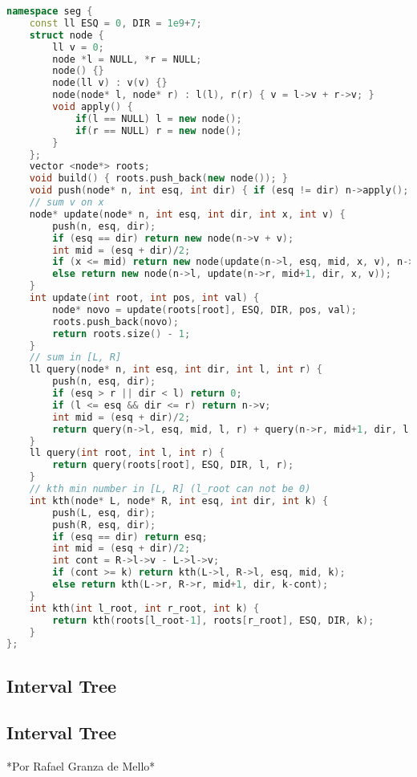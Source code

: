 \documentclass[11pt, a4paper, twoside]{article}
\begin{document}
\begin{lstlisting}[language=C++]
namespace seg {
    const ll ESQ = 0, DIR = 1e9+7;
	struct node {
        ll v = 0;
        node *l = NULL, *r = NULL;
        node() {}
        node(ll v) : v(v) {}
        node(node* l, node* r) : l(l), r(r) { v = l->v + r->v; }
        void apply() {
            if(l == NULL) l = new node();
            if(r == NULL) r = new node();
        }
	};
    vector <node*> roots;
    void build() { roots.push_back(new node()); }
    void push(node* n, int esq, int dir) { if (esq != dir) n->apply(); }
    // sum v on x
    node* update(node* n, int esq, int dir, int x, int v) {
        push(n, esq, dir);
        if (esq == dir) return new node(n->v + v);
        int mid = (esq + dir)/2;
        if (x <= mid) return new node(update(n->l, esq, mid, x, v), n->r);
        else return new node(n->l, update(n->r, mid+1, dir, x, v));
    }
    int update(int root, int pos, int val) {
        node* novo = update(roots[root], ESQ, DIR, pos, val);
        roots.push_back(novo);
        return roots.size() - 1;
    }
    // sum in [L, R]
    ll query(node* n, int esq, int dir, int l, int r) {
        push(n, esq, dir);
        if (esq > r || dir < l) return 0;
        if (l <= esq && dir <= r) return n->v;
        int mid = (esq + dir)/2;
        return query(n->l, esq, mid, l, r) + query(n->r, mid+1, dir, l, r);
    }
    ll query(int root, int l, int r) {
        return query(roots[root], ESQ, DIR, l, r);
    }
    // kth min number in [L, R] (l_root can not be 0)
    int kth(node* L, node* R, int esq, int dir, int k) {
        push(L, esq, dir);
        push(R, esq, dir);
        if (esq == dir) return esq;
        int mid = (esq + dir)/2;
        int cont = R->l->v - L->l->v;
        if (cont >= k) return kth(L->l, R->l, esq, mid, k);
        else return kth(L->r, R->r, mid+1, dir, k-cont);
    }
    int kth(int l_root, int r_root, int k) {
        return kth(roots[l_root-1], roots[r_root], ESQ, DIR, k);
    }
};
\end{lstlisting}

\subsection{Interval Tree}


\subsection{Interval Tree}

*Por Rafael Granza de Mello*
\end{document}
